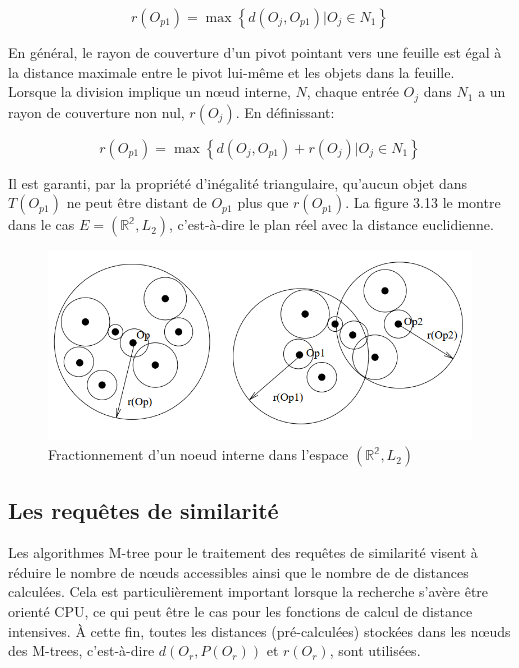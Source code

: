 \begin{equation}
	r(O_{p1}) = \max \left\{d(O_j, O_{p1}) | O_j \in N_1 \right\}
\end{equation}

En général, le rayon de couverture d'un pivot pointant vers une feuille est égal à la distance maximale entre le pivot lui-même et les objets dans la feuille.\\

Lorsque la division implique un nœud interne, $ N $, chaque entrée $ O_j $ dans $ N_1 $ a un rayon de couverture non nul, $ r(O_j) $. En définissant:

\begin{equation}
r(O_{p1}) = \max \left\{d(O_j, O_{p1}) + r(O_j) | O_j \in N_1 \right\}
\end{equation}

Il est garanti, par la propriété d'inégalité triangulaire, qu'aucun objet dans $ T(O_{p1}) $ ne peut être distant de $  O_{p1} $ plus que $ r(O_{p1}) $. La figure 3.13 le montre dans le cas $ E = ( \mathbb{R^2}, L_2) $, c'est-à-dire le plan réel avec la distance euclidienne.
\begin{figure}[H]
	\centering
	\includegraphics[width=.6 \textwidth]{Figures/splitexep.png} %
	\caption{Fractionnement d'un noeud interne dans l'espace  $ ( \mathbb{R^2}, L_2) $}
\end{figure} 

\subsection{Les requêtes de similarité}
Les algorithmes M-tree pour le traitement des requêtes de similarité visent à réduire le nombre de nœuds accessibles ainsi que le nombre de  de distances calculées. Cela est particulièrement important lorsque la recherche s'avère être orienté CPU, ce qui peut être le cas pour les fonctions de calcul de distance intensives. À cette fin, toutes les distances (pré-calculées) stockées dans les nœuds des M-trees, c'est-à-dire $ d(O_r, P(O_r)) $ et $ r(O_r) $, sont utilisées.

